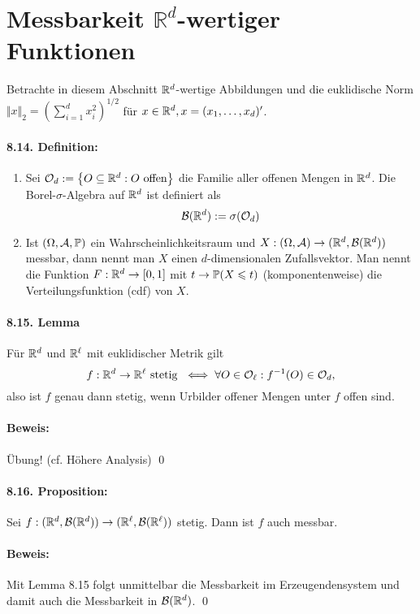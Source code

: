 \section*{Messbarkeit $\mathbb{R}^d$-wertiger Funktionen}
Betrachte in diesem Abschnitt $\mathbb{R}^d$-wertige Abbildungen und die euklidische Norm $\Vert x\Vert_2=\left(\sum_{i=1}^dx_i^2\right)^{1/2}$ f\"ur $x\in\mathbb{R}^d,x=(x_1,\hdots,x_d)'$.

\paragraph{8.14. Definition:}
\begin{enumerate}[label=(\roman*)]
    \item Sei $\mathcal{O}_d:=\left\{O\subseteq\mathbb{R}^d:O \text{ offen}\right\}$ die Familie aller offenen Mengen in $\mathbb{R}^d$. Die Borel-$\sigma$-Algebra auf $\mathbb{R}^d$ ist definiert als
    $$\mathcal{B}(\mathbb{R}^d):=\sigma(\mathcal{O}_d)$$
    \item Ist $(\Omega, \mathcal{A}, \mathbb{P})$ ein Wahrscheinlichkeitsraum und $X:(\Omega,\mathcal{A})\to(\mathbb{R}^d,\mathcal{B}(\mathbb{R}^d))$ messbar, dann nennt man $X$ einen $d$-dimensionalen Zufallsvektor. Man nennt die Funktion $F:\mathbb{R}^d\to[0,1]$ mit $t\to\mathbb{P}(X\leqslant t)$ (komponentenweise) die Verteilungsfunktion (cdf) von $X$.
 \end{enumerate}
 
 \paragraph{8.15. Lemma}F\"ur $\mathbb{R}^d$ und $\mathbb{R}^\ell$ mit euklidischer Metrik gilt
 $$f:\mathbb{R}^d\to\mathbb{R}^\ell\text{ stetig }\iff\forall O\in\mathcal{O}_\ell: f^{-1}(O)\in\mathcal{O}_d,$$
 also ist $f$ genau dann stetig, wenn Urbilder offener Mengen unter $f$ offen sind.
 
 \paragraph{Beweis:}\"Ubung! (cf. H\"ohere Analysis) \qed
 
 \paragraph{8.16. Proposition:} Sei $f:(\mathbb{R}^d,\mathcal{B}(\mathbb{R}^d))\to(\mathbb{R}^\ell,\mathcal{B}(\mathbb{R}^\ell))$ stetig. Dann ist $f$ auch messbar. 
 
\paragraph{Beweis:} Mit Lemma 8.15 folgt unmittelbar die Messbarkeit im Erzeugendensystem und damit auch die Messbarkeit in $\mathcal{B}(\mathbb{R}^d)$. \qed


